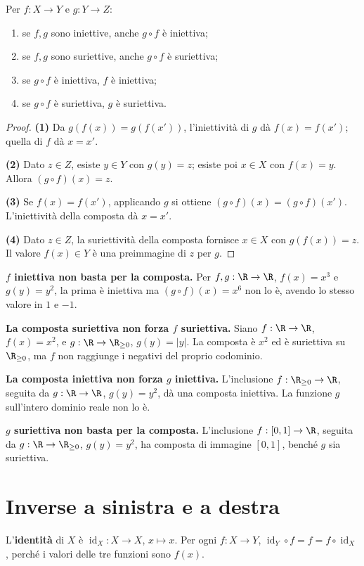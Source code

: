 \begin{proposizione}\label{prop:composte}
Per $f:X\to Y$ e $g:Y\to Z$:
\begin{enumerate}[label=\arabic*.]
\item se $f,g$ sono iniettive, anche $g\circ f$ è iniettiva;
\item se $f,g$ sono suriettive, anche $g\circ f$ è suriettiva;
\item se $g\circ f$ è iniettiva, $f$ è iniettiva;
\item se $g\circ f$ è suriettiva, $g$ è suriettiva.
\end{enumerate}
\end{proposizione}
\begin{proof}
\textbf{(1)} Da $g(f(x))=g(f(x'))$, l'iniettività di $g$ dà $f(x)=f(x')$; quella di $f$ dà $x=x'$.

\textbf{(2)} Dato $z\in Z$, esiste $y\in Y$ con $g(y)=z$; esiste poi $x\in X$ con $f(x)=y$. Allora $(g\circ f)(x)=z$.

\textbf{(3)} Se $f(x)=f(x')$, applicando $g$ si ottiene $(g\circ f)(x)=(g\circ f)(x')$. L'iniettività della composta dà $x=x'$.

\textbf{(4)} Dato $z\in Z$, la suriettività della composta fornisce $x\in X$ con $g(f(x))=z$. Il valore $f(x)\in Y$ è una preimmagine di $z$ per $g$.
\end{proof}

\begin{esempio}
\textbf{$f$ iniettiva non basta per la composta.} Per $f,g:\R\to\R$, $f(x)=x^3$ e $g(y)=y^2$, la prima è iniettiva ma $(g\circ f)(x)=x^6$ non lo è, avendo lo stesso valore in $1$ e $-1$.

\textbf{La composta suriettiva non forza $f$ suriettiva.} Siano $f:\R\to\R$, $f(x)=x^2$, e $g:\R\to\R_{\ge0}$, $g(y)=|y|$. La composta è $x^2$ ed è suriettiva su $\R_{\ge0}$, ma $f$ non raggiunge i negativi del proprio codominio.

\textbf{La composta iniettiva non forza $g$ iniettiva.} L'inclusione $f:\R_{\ge0}\to\R$, seguita da $g:\R\to\R$, $g(y)=y^2$, dà una composta iniettiva. La funzione $g$ sull'intero dominio reale non lo è.

\textbf{$g$ suriettiva non basta per la composta.} L'inclusione $f:[0,1]\to\R$, seguita da $g:\R\to\R_{\ge0}$, $g(y)=y^2$, ha composta di immagine $[0,1]$, benché $g$ sia suriettiva.
\end{esempio}

\section{Inverse a sinistra e a destra}
L'\textbf{identità} di $X$ è $\operatorname{id}_X:X\to X$, $x\mapsto x$. Per ogni $f:X\to Y$, $\operatorname{id}_Y\circ f=f=f\circ\operatorname{id}_X$, perché i valori delle tre funzioni sono $f(x)$.

